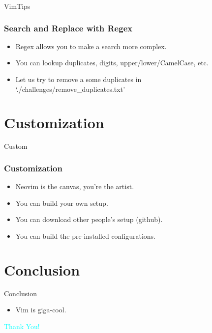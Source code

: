\documentclass{beamer}
\begin{document}
\begin{frame}{VimTips}
    \frametitle{Search and Replace with Regex}
    \begin{itemize}
        \item Regex allows you to make a search more complex.
        \item You can lookup duplicates, digits, upper/lower/CamelCase, etc.
        \item Let us try to remove a some duplicates in `./challenges/remove\_duplicates.txt'
    \end{itemize}
\end{frame}

\section{Customization}
\begin{frame}{Custom}
    \frametitle{Customization}
    \begin{itemize}
        \item Neovim is the canvas, you're the artist.
        \item You can build your own setup.
        \item You can download other people's setup (github).
        \item You can build the pre-installed configurations.
    \end{itemize}
\end{frame}
\section{Conclusion}
\begin{frame}{Conclusion}
    \begin{itemize}
        \item Vim is giga-cool.
    \end{itemize}
\end{frame}

\begin{frame}
    \centering
    {\Huge \textcolor{cyan}{Thank You!}}
\end{frame}
\end{document}
